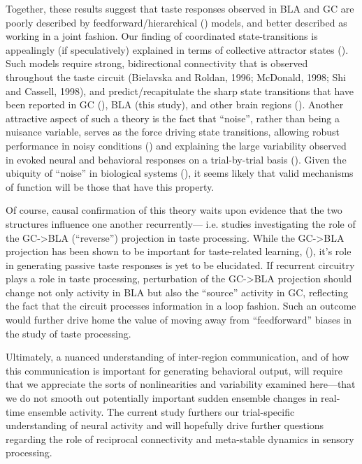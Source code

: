 \begin{refsection}
Together, these results suggest that taste responses observed in BLA and GC are poorly described by feedforward/hierarchical (\cite{parras2017a,glaser2018a,heidari-gorji2021a}) models, and better described as working in a joint fashion. Our finding of coordinated state-transitions is appealingly (if speculatively) explained in terms of collective attractor states (\cite{miller2010a,litwin-kumar2012a,camera2019a,recanatesi2022a}). Such models require strong, bidirectional connectivity that is observed throughout the taste circuit (Bielavska and Roldan, 1996; McDonald, 1998; Shi and Cassell, 1998), and predict/recapitulate the sharp state transitions that have been reported in GC (\cite{jones2007a,sadacca2016a}), BLA (this study), and other brain regions (\cite{seidemann1996a,gat1997a,sugase1999a,latimer2015a}). Another attractive aspect of such a theory is the fact that “noise”, rather than being a nuisance variable, serves as the force driving state transitions, allowing robust performance in noisy conditions (\cite{miller2013a}) and explaining the large variability observed in evoked neural and behavioral responses on a trial-by-trial basis (\cite{kisley1999a,carandini2004a,jones2007a,kotekal2020a,peixoto2021a}). Given the ubiquity of “noise” in biological systems (\cite{shadlen1994a,shadlen1998a,miller2010a}), it seems likely that valid mechanisms of function will be those that have this property. 

Of course, causal confirmation of this theory waits upon evidence that the two structures influence one another recurrently— i.e. studies investigating the role of the GC->BLA (“reverse”) projection in taste processing. While the GC->BLA projection has been shown to be important for taste-related learning, (\cite{lavi2018a,kayyal2019a}), it’s role in generating passive taste responses is yet to be elucidated. If recurrent circuitry plays a role in taste processing, perturbation of the GC->BLA projection should change not only activity in BLA but also the “source” activity in GC, reflecting the fact that the circuit processes information in a loop fashion. Such an outcome would further drive home the value of moving away from “feedforward” biases in the study of taste processing. 

Ultimately, a nuanced understanding of inter-region communication, and of how this communication is important for generating behavioral output, will require that we appreciate the sorts of nonlinearities and variability examined here—that we do not smooth out potentially important sudden ensemble changes in real-time ensemble activity. The current study furthers our trial-specific understanding of neural activity and will hopefully drive further questions regarding the role of reciprocal connectivity and meta-stable dynamics in sensory processing.

\printbibliography[title={References}]

\end{refsection}